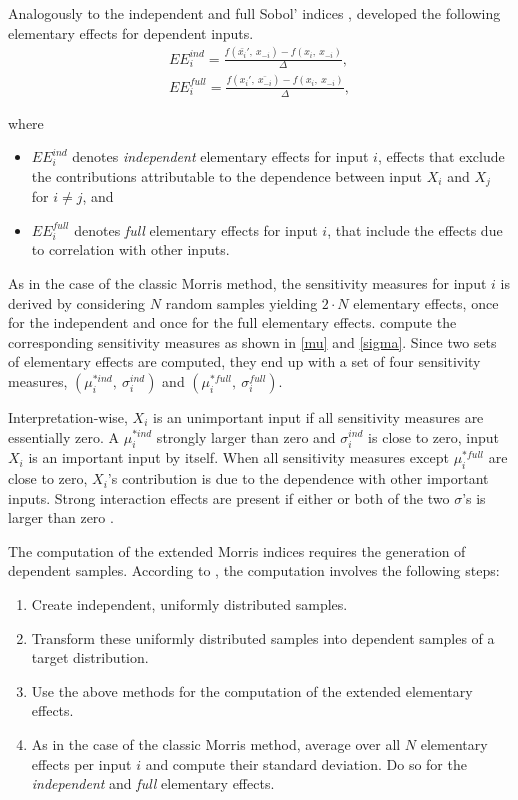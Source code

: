 Analogously to the independent and full Sobol' indices \citep{MTA15}, \citet{GM17} developed the following elementary effects for dependent inputs.
\begin{align}
EE_i^{ind} = \frac{f(\bar{x_i}',\ x_{-i}) - f(x_i,\ x_{-i})}{\Delta},\\
EE_i^{full} = \frac{f(x_i',\ \bar{x_{-i}}) - f(x_i,\ x_{-i})}{\Delta},
\end{align}

\noindent where
\begin{itemize}
\item $EE_i^{ind}$ denotes \textit{independent} elementary effects for input $i$, effects that exclude the contributions attributable to the dependence between input $X_i$ and $X_j$ for $i \neq j$, and
\item $EE_i^{full}$ denotes \textit{full} elementary effects for input $i$, that include the effects due to correlation with other inputs.
\end{itemize}

As in the case of the classic Morris method, the sensitivity measures for input $i$ is derived by considering $N$ random samples yielding $2 \cdot N$ elementary effects, once for the independent and once for the full elementary effects. \citet{GM17} compute the corresponding sensitivity measures as shown in \cref{mu} and \cref{sigma}. Since two sets of elementary effects are computed, they end up with a set of four sensitivity measures, $(\mu^{\ast ind}_i,\ \sigma_i^{ind})$ and $(\mu^{\ast full}_i,\ \sigma_i^{full})$.

Interpretation-wise, $X_i$ is an unimportant input if all sensitivity measures are essentially zero. A $\mu^{\ast ind}_i$ strongly larger than zero and $\sigma_i^{ind}$ is close to zero, input $X_i$ is an important input by itself. When all sensitivity measures except $\mu^{\ast full}_i$ are close to zero, $X_i$'s contribution is due to the dependence with other important inputs. Strong interaction effects are present if either or both of the two $\sigma$'s is larger than zero \citep{GM17}.

The computation of the extended Morris indices requires the generation of dependent samples. According to \citet{GM17}, the computation involves the following steps:

\begin{enumerate}
    \item Create independent, uniformly distributed samples.
    \item Transform these uniformly distributed samples into dependent samples of a target distribution.
    \item Use the above methods for the computation of the extended elementary effects.
    \item As in the case of the classic Morris method, average over all $N$ elementary effects per input $i$ and compute their standard deviation. Do so for the \textit{independent} and \textit{full} elementary effects.
\end{enumerate}

